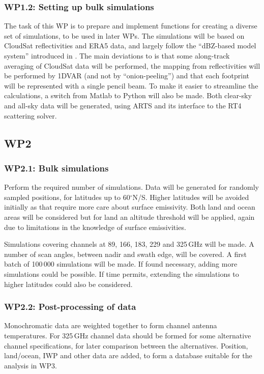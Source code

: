 \documentclass[BCOR=1cm,12pt,bibliography=totoc]{article}
\begin{document}
\subsubsection*{WP1.2: Setting up bulk simulations}
%
The task of this WP is to prepare and implement functions for creating a
diverse set of simulations, to be used in later WPs. The simulations will be
based on CloudSat reflectivities and ERA5 data, and largely follow the
``dBZ-based model system'' introduced in \citet{ekelund:using:20}. The main
deviations to \citet{ekelund:using:20} is that some along-track averaging of
CloudSat data will be performed, the mapping from reflectivities will be
performed by 1DVAR (and not by ``onion-peeling'') and that each footprint will
be represented with a single pencil beam. To make it easier to streamline the
calculations, a switch from Matlab to Python will also be made. Both clear-sky
and all-sky data will be generated, using ARTS and its interface to the RT4
scattering solver.


\subsection*{WP2}
%
\subsubsection*{WP2.1: Bulk simulations}
%
Perform the required number of simulations. Data will be generated for randomly
sampled positions, for latitudes up to  60$^\circ$N/S. Higher latitudes
will be avoided initially as that require more care about surface emissivity.
Both land and ocean areas will be considered but for land an altitude threshold
will be applied, again due to limitations in the knowledge of surface
emissivities. 

Simulations covering channels at 89, 166, 183, 229 and 325\,GHz will be made. A
number of scan angles, between nadir and swath edge, will be covered. A first
batch of 100\,000 simulations will be made. If found necessary, adding more
simulations could be possible. If time permits, extending the simulations to
higher latitudes could also be considered.


\subsubsection*{WP2.2: Post-processing of data}
%
Monochromatic data are weighted together to form channel antenna temperatures.
For 325\,GHz channel data should be formed for some alternative channel
specifications, for later comparison between the alternatives. Position,
land/ocean, IWP and other data are added, to form a database suitable for the
analysis in WP3. 
\end{document}
